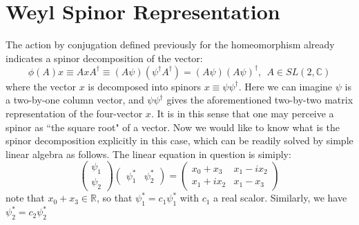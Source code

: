 \documentclass[11pt]{article}
\theoremstyle{remark}
\theoremstyle{definition}
\numberwithin{thm}{section}
\begin{document}
\section{Weyl Spinor Representation}
The action by conjugation defined previously for the homeomorphism already indicates a spinor decomposition of the vector:
\begin{equation}
	\phi(A)x \equiv AxA^\dagger \equiv (A\psi)(\psi^\dagger A^\dagger) = (A\psi)(A\psi)^\dagger, ~~A \in SL(2, \mathbb{C})
\end{equation}
where the vector $x$ is decomposed into spinors  $x \equiv \psi \psi^\dagger$. Here we can imagine $\psi$ is a two-by-one column vector, and  $\psi \psi^\dagger$ gives the aforementioned two-by-two matrix representation of the four-vector $x$.  It is in this sense that one may perceive a spinor as ``the square root" of a vector. 
Now we would like to know what is the spinor decomposition explicitly in this case, which can be readily solved by simple linear algebra as follows. The linear equation in question is simiply:
\begin{equation}
	\begin{pmatrix}
		\psi_1 \\ \psi_2
	\end{pmatrix}
	\begin{pmatrix}
		\psi_1^* & \psi_2^*
	\end{pmatrix}
	=
	\begin{pmatrix}
		x_0 + x_3 & x_1 - ix_2 \\
		x_1 + ix_2 & x_1 - x_3
	\end{pmatrix}
\end{equation}
note that $x_0 + x_3 \in \mathbb{R}$, so that  $\psi_1^* = c_1\psi_1^*$ with $c_1$ a real scalor. Similarly, we have $\psi_2^* = c_2 \psi_2^*$

























%
\end{document}
